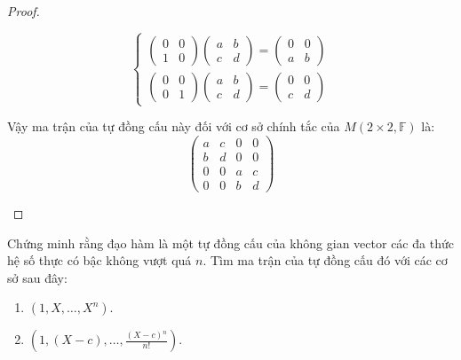 \documentclass[class=linearalgebra,crop=false]{standalone}
\begin{document}
\begin{proof}
\begin{enumerate}[label = (\alph*)]
\[\begin{cases}
                      \begin{pmatrix}
                          0 & 0 \\
                          1 & 0
                      \end{pmatrix}
                      \begin{pmatrix}
                          a & b \\
                          c & d
                      \end{pmatrix}=
                      \begin{pmatrix}
                          0 & 0 \\
                          a & b
                      \end{pmatrix} \\
                      \begin{pmatrix}
                          0 & 0 \\
                          0 & 1
                      \end{pmatrix}
                      \begin{pmatrix}
                          a & b \\
                          c & d
                      \end{pmatrix}=
                      \begin{pmatrix}
                          0 & 0 \\
                          c & d
                      \end{pmatrix}
                  \end{cases}
              \]
              \par Vậy ma trận của tự đồng cấu này đối với cơ sở chính tắc của $M(2\times 2,\mathbb{F})$ là:
              \[
                  \begin{pmatrix}
                      a & c & 0 & 0 \\
                      b & d & 0 & 0 \\
                      0 & 0 & a & c \\
                      0 & 0 & b & d
                  \end{pmatrix}
              \]
    \end{enumerate}
\end{proof}

\begin{exercise}
    Chứng minh rằng đạo hàm là một tự đồng cấu của không gian vector các đa thức hệ số thực có bậc không vượt quá $n$. Tìm ma trận của tự đồng cấu đó với các cơ sở sau đây:
    \begin{enumerate}[label = (\alph*)]
        \item $(1, X, \ldots, X^{n})$.
        \item $(1, (X-c), \ldots, \frac{(X-c){}^{n}}{n!})$.
    \end{enumerate}
\end{exercise}
\end{document}
